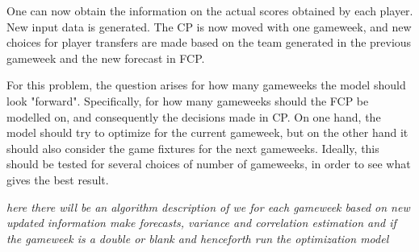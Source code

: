 One can now obtain the information on the actual scores obtained by each player. New input data is generated. The CP is now moved with one gameweek, and new choices for player transfers are made based on the team generated in the previous gameweek and the new forecast in FCP. 

\newpar

For this problem, the question arises for how many gameweeks the model should look "forward". Specifically, for how many gameweeks should the FCP be modelled on, and consequently the decisions made in CP. On one hand, the model should try to optimize for the current gameweek, but on the other hand it should also consider the game fixtures for the next gameweeks. Ideally, this should be tested for several choices of number of gameweeks, in order to see what gives the best result. 


\newpar



\textit{here there will be an algorithm description of we for each gameweek based on new updated information make forecasts, variance and correlation estimation and if the gameweek is a double or blank and henceforth run the optimization model}

